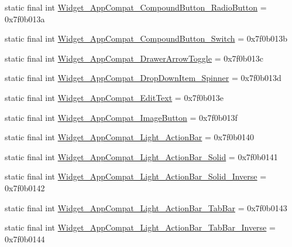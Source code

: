 \begin{CompactItemize}
\item 
static final int \hyperlink{classandroid_1_1support_1_1graphics_1_1drawable_1_1_r_1_1style_246e954947b42606ab50383dc729d702}{Widget\_\-AppCompat\_\-CompoundButton\_\-RadioButton} = 0x7f0b013a
\item 
static final int \hyperlink{classandroid_1_1support_1_1graphics_1_1drawable_1_1_r_1_1style_0ffdbdc2e9fd4f514fc080a868204dec}{Widget\_\-AppCompat\_\-CompoundButton\_\-Switch} = 0x7f0b013b
\item 
static final int \hyperlink{classandroid_1_1support_1_1graphics_1_1drawable_1_1_r_1_1style_50435bca5b32a347f87fa91ac7afa501}{Widget\_\-AppCompat\_\-DrawerArrowToggle} = 0x7f0b013c
\item 
static final int \hyperlink{classandroid_1_1support_1_1graphics_1_1drawable_1_1_r_1_1style_00b639252dc69e0ade296de7122b285c}{Widget\_\-AppCompat\_\-DropDownItem\_\-Spinner} = 0x7f0b013d
\item 
static final int \hyperlink{classandroid_1_1support_1_1graphics_1_1drawable_1_1_r_1_1style_0d934aeec00939706c8396cb989d601c}{Widget\_\-AppCompat\_\-EditText} = 0x7f0b013e
\item 
static final int \hyperlink{classandroid_1_1support_1_1graphics_1_1drawable_1_1_r_1_1style_18a850f681a211a65762cf9d45ad610d}{Widget\_\-AppCompat\_\-ImageButton} = 0x7f0b013f
\item 
static final int \hyperlink{classandroid_1_1support_1_1graphics_1_1drawable_1_1_r_1_1style_d13c34ab724fd72a83c74af4d5e48f8f}{Widget\_\-AppCompat\_\-Light\_\-ActionBar} = 0x7f0b0140
\item 
static final int \hyperlink{classandroid_1_1support_1_1graphics_1_1drawable_1_1_r_1_1style_985750f2f7a7c210ae4415a29c787305}{Widget\_\-AppCompat\_\-Light\_\-ActionBar\_\-Solid} = 0x7f0b0141
\item 
static final int \hyperlink{classandroid_1_1support_1_1graphics_1_1drawable_1_1_r_1_1style_d1c80acf2cbeb12428fda2326240c3bd}{Widget\_\-AppCompat\_\-Light\_\-ActionBar\_\-Solid\_\-Inverse} = 0x7f0b0142
\item 
static final int \hyperlink{classandroid_1_1support_1_1graphics_1_1drawable_1_1_r_1_1style_daeff9dab7d8020947fc7511747b9bf5}{Widget\_\-AppCompat\_\-Light\_\-ActionBar\_\-TabBar} = 0x7f0b0143
\item 
static final int \hyperlink{classandroid_1_1support_1_1graphics_1_1drawable_1_1_r_1_1style_bb327f4987f3a10825ef5ac5577210a5}{Widget\_\-AppCompat\_\-Light\_\-ActionBar\_\-TabBar\_\-Inverse} = 0x7f0b0144
\item 

\end{CompactItemize}
